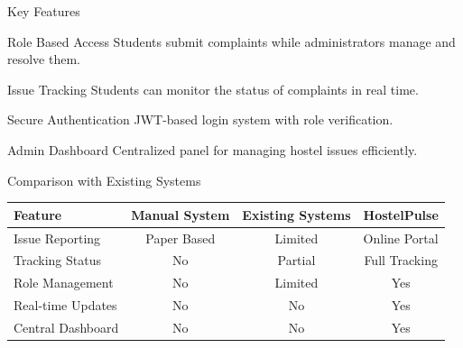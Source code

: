\documentclass{beamer}
\begin{document}
\begin{frame}{Key Features}

\begin{block}{Role Based Access}
Students submit complaints while administrators manage and resolve them.
\end{block}

\begin{block}{Issue Tracking}
Students can monitor the status of complaints in real time.
\end{block}

\begin{block}{Secure Authentication}
JWT-based login system with role verification.
\end{block}

\begin{block}{Admin Dashboard}
Centralized panel for managing hostel issues efficiently.
\end{block}

\end{frame}

\begin{frame}{Comparison with Existing Systems}

\begin{center}
\begin{tabular}{lccc}
\toprule
Feature & Manual System & Existing Systems & HostelPulse \\
\midrule
Issue Reporting & Paper Based & Limited & Online Portal \\
Tracking Status & No & Partial & Full Tracking \\
Role Management & No & Limited & Yes \\
Real-time Updates & No & No & Yes \\
Central Dashboard & No & No & Yes \\
\bottomrule
\end{tabular}
\end{center}

\end{frame}
\end{document}
